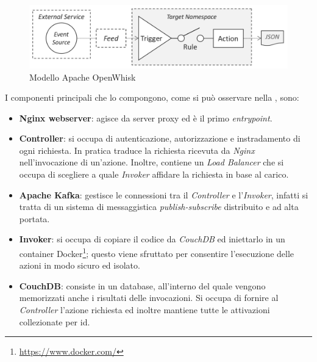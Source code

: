 \documentclass[12pt,a4paper,openany,twoside]{book}
\begin{document}
\begin{figure}[ht]
    \centering
    \includegraphics[width=\linewidth]{figures/Programming_model_OpenWhisk.pdf}
    \caption{Modello Apache OpenWhisk}
    \label{fig:modello-apache-openwhisk}
\end{figure}
\noindent
I componenti principali che lo compongono, come si può osservare nella , sono:
\begin{itemize}
    \item \textbf{Nginx webserver}: agisce da server proxy ed è il primo \textit{entrypoint}.
    
    \item \textbf{Controller}: si occupa di autenticazione, autorizzazione e instradamento di ogni richiesta.
    In pratica traduce la richiesta ricevuta da \textit{Nginx} nell'invocazione di un'azione. Inoltre, contiene un \textit{Load Balancer} che si occupa di scegliere a quale \textit{Invoker} affidare la richiesta in base al carico.
    
    \item \textbf{Apache Kafka}: gestisce le connessioni tra il \textit{Controller} e l'\textit{Invoker}, infatti si tratta di un sistema di messaggistica \textit{publish-subscribe} distribuito e ad alta portata.
    
    \item \textbf{Invoker}: si occupa di copiare il codice da \textit{CouchDB} ed iniettarlo in un container Docker\footnote{\url{https://www.docker.com/}}; questo viene sfruttato per consentire l'esecuzione delle azioni in modo sicuro ed isolato.
    
    \item \textbf{CouchDB}: consiste in un database, all'interno del quale vengono memorizzati anche i risultati delle invocazioni. Si occupa di fornire al \textit{Controller} l'azione richiesta ed inoltre mantiene tutte le attivazioni collezionate per id.
\end{itemize}
\end{document}
